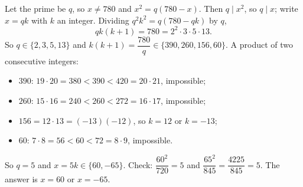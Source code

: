 Let the prime be $q$, so $x\ne780$ and $x^2=q(780-x)$. Then $q\mid x^2$, so $q\mid x$; write $x=qk$ with $k$ an integer. Dividing $q^2k^2=q(780-qk)$ by $q$,
\[qk(k+1)=780=2^2\cdot3\cdot5\cdot13.\]
So $q\in\{2,3,5,13\}$ and $k(k+1)=\dfrac{780}{q}\in\{390,260,156,60\}$. A product of two consecutive integers:
\begin{itemize}
\item $390$: $19\cdot20=380<390<420=20\cdot21$, impossible;
\item $260$: $15\cdot16=240<260<272=16\cdot17$, impossible;
\item $156=12\cdot13=(-13)(-12)$, so $k=12$ or $k=-13$;
\item $60$: $7\cdot8=56<60<72=8\cdot9$, impossible.
\end{itemize}
So $q=5$ and $x=5k\in\{60,-65\}$. Check: $\dfrac{60^2}{720}=5$ and $\dfrac{65^2}{845}=\dfrac{4225}{845}=5$. The answer is $\boxed{x=60\text{ or }x=-65}$.
